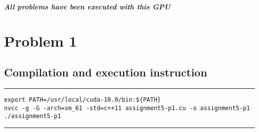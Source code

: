 \documentclass[a4paper]{article}
\begin{document}
{\bf \emph{All problems have been executed with this GPU}}


\newpage

\section{\Huge Problem 1}
\vspace{0.5cm}
\subsection{Compilation and execution instruction }
\vspace{0.3cm}
\hrule
\begin{lstlisting}
export PATH=/usr/local/cuda-10.0/bin:${PATH}
nvcc -g -G -arch=sm_61 -std=c++11 assignment5-p1.cu -o assignment5-p1
./assignment5-p1
\end{lstlisting}
\hrule 
\vspace{0.5cm}
\end{document}
